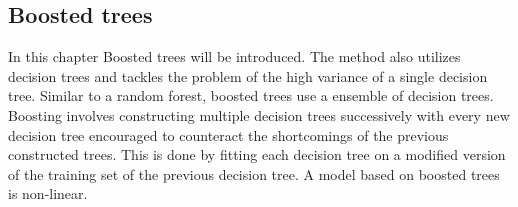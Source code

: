 \subsection{Boosted trees}

In this chapter Boosted trees will be introduced. The method also utilizes decision trees and tackles the problem of the high variance of a single decision tree. 
Similar to a random forest, boosted trees use a ensemble of decision trees. Boosting involves constructing multiple decision trees successively with every new decision tree encouraged to counteract the shortcomings of the previous constructed trees. This is done by fitting each decision tree on a modified version of the training set of the previous decision tree.
A model based on boosted trees is non-linear.
\\

